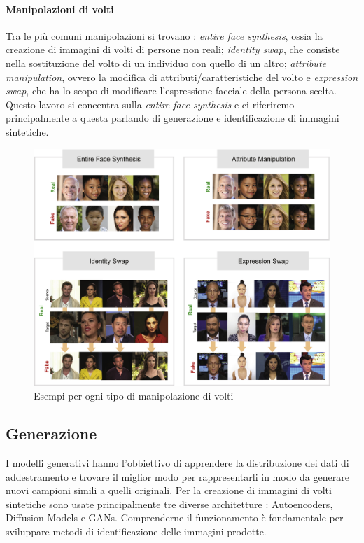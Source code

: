 \paragraph{Manipolazioni di volti} Tra le più comuni manipolazioni si trovano \cite{tolosana2020deepfakes}:
\textit{entire face synthesis}, ossia la creazione di immagini di volti di persone non reali; \textit{identity swap}, che consiste nella sostituzione del volto di un individuo con quello di un altro; \textit{attribute manipulation}, ovvero la modifica di attributi/caratteristiche del volto e \textit{expression swap}, che ha lo scopo di modificare l'espressione facciale della persona scelta.\\
Questo lavoro si concentra sulla \textit{entire face synthesis} e ci riferiremo principalmente a questa parlando di generazione e identificazione  di immagini sintetiche.
\begin{figure}
    \centering
     \includegraphics[width=1\linewidth]{img/face manipulations.jpg}
     \caption{Esempi per ogni tipo di manipolazione di volti}
     \label{fig:facemanip}
\end{figure}
\subsection{Generazione}
I modelli generativi  hanno l'obbiettivo di apprendere la distribuzione dei dati di addestramento e trovare il miglior modo per rappresentarli in modo da generare nuovi campioni simili a quelli originali.
Per la creazione di immagini di volti sintetiche sono usate principalmente tre diverse architetture \cite{fernando2025face}: Autoencoders, Diffusion Models e GANs. Comprenderne il funzionamento è fondamentale per sviluppare metodi di identificazione delle immagini prodotte.
